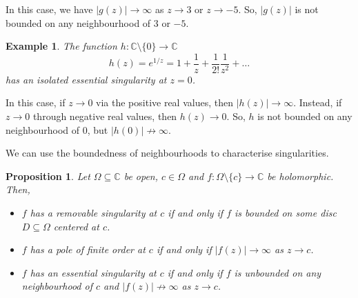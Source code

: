 \documentclass[a4paper, openany]{memoir}
\theoremstyle{definition}
\theoremstyle{plain}
\newtheorem{proposition}[definition]{Proposition}
\newtheorem{example}[definition]{Example}
\begin{document}
\noindent In this case, we have $|g(z)| \to \infty$ as $z \to 3$ or $z \to -5$. So, $|g(z)|$ is not bounded on any neighbourhood of $3$ or $-5$.
\begin{example}
The function $h: \mathbb{C} \setminus \{0\} \to \mathbb{C}$
\[h(z) = e^{1/z} = 1  + \frac{1}{z} + \frac{1}{2!} \frac{1}{z^2} + \dots\]
has an isolated essential singularity at $z = 0$.
\end{example}
\noindent In this case, if $z \to 0$ via the positive real values, then $|h(z)| \to \infty$. Instead, if $z \to 0$ through negative real values, then $h(z) \to 0$. So, $h$ is not bounded on any neighbourhood of $0$, but $|h(0)| \not\to \infty$.

We can use the boundedness of neighbourhoods to characterise singularities.
\begin{proposition}
Let $\Omega \subseteq \mathbb{C}$ be open, $c \in \Omega$ and $f: \Omega \setminus \{c\} \to \mathbb{C}$ be holomorphic. Then,
\begin{itemize}
    \item $f$ has a removable singularity at $c$ if and only if $f$ is bounded on some disc $D \subseteq \Omega$ centered at $c$.
    \item $f$ has a pole of finite order at $c$ if and only if $|f(z)| \to \infty$ as $z \to c$.
    \item $f$ has an essential singularity at $c$ if and only if $f$ is unbounded on any neighbourhood of $c$ and $|f(z)| \not\to \infty$ as $z \to c$.
\end{itemize}
\end{proposition}
\end{document}
